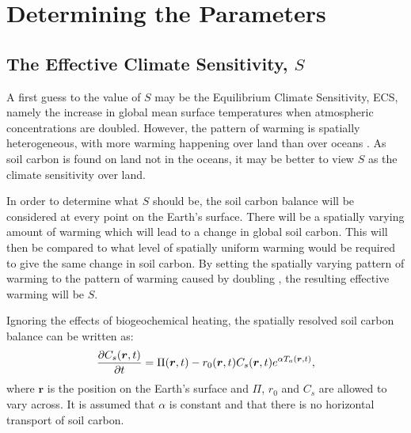 \section{Determining the Parameters}
\subsection{The Effective Climate Sensitivity, $S$}
A first guess to the value of $S$ may be the Equilibrium Climate Sensitivity, ECS, namely the increase in global mean surface temperatures when atmospheric  concentrations
are doubled. However, the pattern of warming is spatially heterogeneous, with more warming happening over land than over oceans \parencite{Morice2021}. As soil carbon is found on land not
in the oceans, it may be better to view $S$ as the climate sensitivity over land.

In order to determine what $S$ should be, the soil carbon balance will be considered at every point on the Earth's surface. There will be a spatially varying amount of warming which will
lead to a change in global soil carbon. This will then be compared to what level of spatially uniform warming would be required to give the same change in soil carbon. By setting the spatially varying
pattern of warming to the pattern of warming caused by doubling , the resulting effective warming will be $S$.

Ignoring the effects of biogeochemical heating, the spatially resolved soil carbon balance can be written as:
\begin{equation}
  \label{eq:spatially_resolved_soil_carbon}
  \pdv{C_s(\bm{r},t)}{t} = \Pi(\bm{r},t) - r_0(\bm{r},t)C_s(\bm{r},t)e^{\alpha T_a(\bm{r},t)},
\end{equation}
where $\bm{r}$ is the position on the Earth's surface and $\Pi$, $r_0$ and $C_s$ are allowed to vary across. It is assumed that $\alpha$ is constant and that there is no
horizontal transport of soil carbon.

